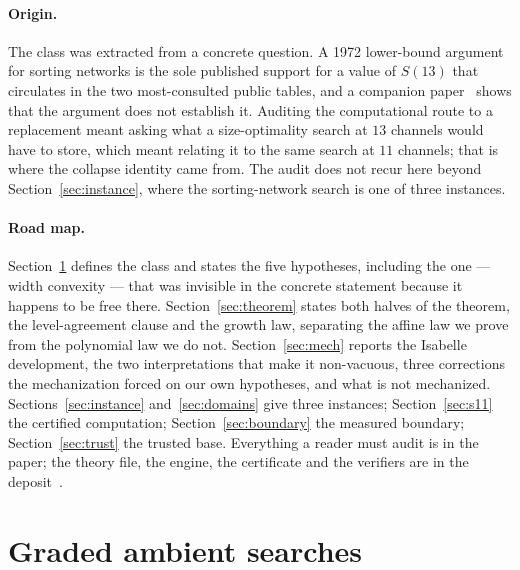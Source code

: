 \documentclass[11pt,a4paper]{article}
\theoremstyle{plain}
\theoremstyle{definition}
\theoremstyle{remark}
\begin{document}
\paragraph{Origin.}
The class was extracted from a concrete question. A 1972 lower-bound argument
for sorting networks is the sole published support for a value of $S(13)$ that
circulates in the two most-consulted public tables, and a companion
paper~\cite{Paper1} shows that the argument does not establish it. Auditing the
computational route to a replacement meant asking what a size-optimality search
at $13$ channels would have to store, which meant relating it to the same
search at $11$ channels; that is where the collapse identity came from. The
audit does not recur here beyond Section~\ref{sec:instance}, where the
sorting-network search is one of three instances.

\paragraph{Road map.}
Section~\ref{sec:class} defines the class and states the five hypotheses,
including the one --- width convexity --- that was invisible in the concrete
statement because it happens to be free there.
Section~\ref{sec:theorem} states both halves of the theorem, the
level-agreement clause and the growth law, separating the affine law we prove
from the polynomial law we do not. Section~\ref{sec:mech} reports the Isabelle
development, the two interpretations that make it non-vacuous, three
corrections the mechanization forced on our own hypotheses, and what is not
mechanized. Sections~\ref{sec:instance} and~\ref{sec:domains} give three
instances; Section~\ref{sec:s11} the certified computation;
Section~\ref{sec:boundary} the measured boundary; Section~\ref{sec:trust} the
trusted base. Everything a reader must audit is in the paper; the theory file,
the engine, the certificate and the verifiers are in the
deposit~\cite{Artifact}.

\section{Graded ambient searches}\label{sec:class}
\end{document}
